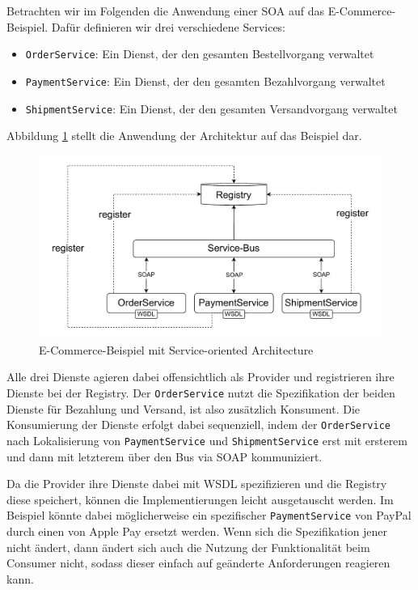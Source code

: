 \documentclass[acmtog]{acmart}
\begin{document}
Betrachten wir im Folgenden die Anwendung einer SOA auf das E-Commerce-Beispiel.
Dafür definieren wir drei verschiedene Services:
\begin{itemize}
  \item \texttt{OrderService}: Ein Dienst, der den gesamten Bestellvorgang verwaltet
  \item \texttt{PaymentService}: Ein Dienst, der den gesamten Bezahlvorgang verwaltet
  \item \texttt{ShipmentService}: Ein Dienst, der den gesamten Versandvorgang verwaltet
\end{itemize}

Abbildung \ref{fig:soaecommerce} stellt die Anwendung der Architektur auf das Beispiel dar.
\begin{figure}[!h]
  \centering
  \includegraphics[width=0.8\linewidth]{images/soa/soa-example.pdf}
  \caption{E-Commerce-Beispiel mit Service-oriented Architecture}
  \label{fig:soaecommerce}
\end{figure}

Alle drei Dienste agieren dabei offensichtlich als Provider und registrieren ihre Dienste bei der Registry.
Der \texttt{OrderService} nutzt die Spezifikation der beiden Dienste für Bezahlung und Versand, ist also zusätzlich Konsument.
Die Konsumierung der Dienste erfolgt dabei sequenziell, indem der \texttt{OrderService} nach Lokalisierung von \texttt{PaymentService} und \texttt{ShipmentService}
erst mit ersterem und dann mit letzterem über den Bus via SOAP kommuniziert.

Da die Provider ihre Dienste dabei mit WSDL spezifizieren und die Registry diese speichert, können die Implementierungen leicht ausgetauscht werden.
Im Beispiel könnte dabei möglicherweise ein spezifischer \texttt{PaymentService} von PayPal durch einen von Apple Pay ersetzt werden.
Wenn sich die Spezifikation jener nicht ändert, dann ändert sich auch die Nutzung der Funktionalität beim Consumer nicht, sodass dieser einfach
auf geänderte Anforderungen reagieren kann.
\end{document}
